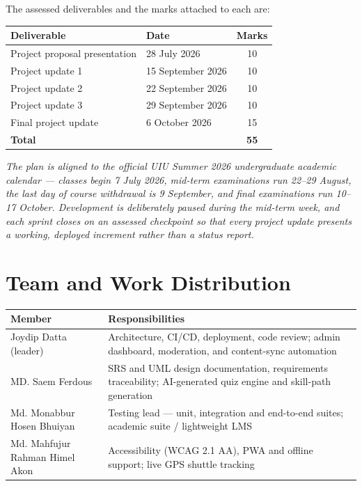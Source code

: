 \documentclass[11pt, a4paper]{article}
\begin{document}
\noindent The assessed deliverables and the marks attached to each are:

\begin{center}
\begin{tabular}{llc}
    \toprule
    \textbf{Deliverable} & \textbf{Date} & \textbf{Marks} \\
    \midrule
    Project proposal presentation & 28 July 2026      & 10 \\
    Project update 1              & 15 September 2026 & 10 \\
    Project update 2              & 22 September 2026 & 10 \\
    Project update 3              & 29 September 2026 & 10 \\
    Final project update          & 6 October 2026    & 15 \\
    \midrule
    \textbf{Total} &  & \textbf{55} \\
    \bottomrule
\end{tabular}
\end{center}

\noindent\emph{The plan is aligned to the official UIU Summer 2026
undergraduate academic calendar --- classes begin 7 July 2026, mid-term
examinations run 22--29 August, the last day of course withdrawal is
9 September, and final examinations run 10--17 October. Development is
deliberately paused during the mid-term week, and each sprint closes on an
assessed checkpoint so that every project update presents a working,
deployed increment rather than a status report.}

\section{Team and Work Distribution}

\begin{center}
\begin{tabular}{p{4cm}p{9.7cm}}
    \toprule
    \textbf{Member} & \textbf{Responsibilities} \\
    \midrule
    Joydip Datta (leader) & Architecture, CI/CD, deployment, code review;
    admin dashboard, moderation, and content-sync automation \\
    MD. Saem Ferdous & SRS and UML design documentation, requirements
    traceability; AI-generated quiz engine and skill-path generation \\
    Md. Monabbur Hosen Bhuiyan & Testing lead --- unit, integration and
    end-to-end suites; academic suite / lightweight LMS \\
    Md. Mahfujur Rahman Himel Akon & Accessibility (WCAG 2.1 AA), PWA and
    offline support; live GPS shuttle tracking \\
    \bottomrule
\end{tabular}
\end{center}
\end{document}
